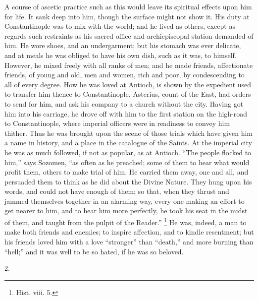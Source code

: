 A course of ascetic practice such as this would leave its spiritual
effects upon him for life. It sank deep into him, though the surface
might not show it. His duty at Constantinople was to mix with the
world; and he lived as others, except as regards such restraints as
his sacred office and archiepiscopal station demanded of him. He wore
shoes, and an undergarment; but his stomach was ever delicate, and at
meals he was obliged to have his own dish, such as it was, to himself.
However, he mixed freely with all ranks of men; and he made friends,
affectionate friends, of young and old, men and women, rich and poor,
by condescending to all of every degree. How he was loved at Antioch,
is shown by the expedient used to transfer him thence to
Constantinople. Asterius, count of the East, had orders to send for
him, and ask his company to a church without the city. Having got him
into his carriage, he drove off with him to the first station on the
high-road to Constantinople, where imperial officers were in readiness
to convey him thither. Thus he was brought upon the scene of those
trials which have given him a name in history, and a place in the
catalogue of the Saints. At the imperial city he was as much followed,
if not as popular, as at Antioch. ``The people flocked to
him,'' says Sozomen, ``as often as he preached; some of them
to hear what would profit them, others to make trial of him. He
carried them away, one and all, and persuaded them to think as he did
about the Divine Nature. They hung upon his words, and could not have
enough of them; so that, when they thrust and jammed themselves
together in an alarming way, every one making an effort to get
nearer to him, and to hear him more perfectly, he took his seat in the
midst of them, and taught from the pulpit of the Reader.'' \footnote{Hist. viii. 5.} He was, indeed, a man to make both friends and enemies; to
inspire affection, and to kindle resentment; but his friends loved him
with a love ``stronger'' than ``death,'' and more
burning than ``hell;'' and it was well to be so hated, if he
was so beloved.

2.

